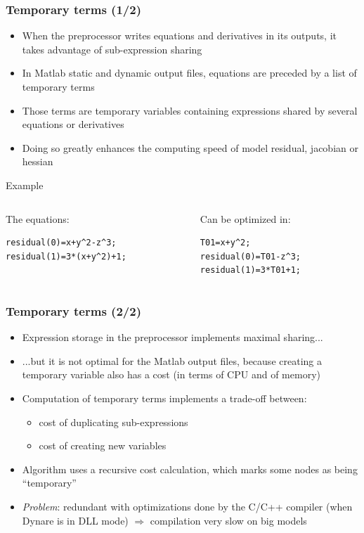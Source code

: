\documentclass{beamer}
\begin{document}
\begin{frame}[fragile]
  \frametitle{Temporary terms (1/2)}
  \begin{itemize}
  \item When the preprocessor writes equations and derivatives in its outputs, it takes advantage of sub-expression sharing
  \item In Matlab static and dynamic output files, equations are preceded by a list of \alert{temporary terms}
  \item Those terms are temporary variables containing expressions shared by several equations or derivatives
  \item Doing so greatly enhances the computing speed of model residual, jacobian or hessian
  \end{itemize}
  \begin{block}{Example}
    \begin{columns}[t]
      \begin{column}{6cm}
        The equations:
\begin{verbatim}
residual(0)=x+y^2-z^3;
residual(1)=3*(x+y^2)+1;
\end{verbatim}
      \end{column}
      \begin{column}{4.8cm}
        Can be optimized in:
\begin{verbatim}
T01=x+y^2;
residual(0)=T01-z^3;
residual(1)=3*T01+1;
\end{verbatim}
      \end{column}
    \end{columns}
  \end{block}
\end{frame}

\begin{frame}
  \frametitle{Temporary terms (2/2)}
  \begin{itemize}
  \item Expression storage in the preprocessor implements maximal sharing...
  \item ...but it is not optimal for the Matlab output files, because creating a temporary variable also has a cost (in terms of CPU and of memory)
  \item Computation of temporary terms implements a trade-off between:
    \begin{itemize}
    \item cost of duplicating sub-expressions
    \item cost of creating new variables
    \end{itemize}
  \item Algorithm uses a recursive cost calculation, which marks some nodes as being ``temporary''
  \item \textit{Problem}: redundant with optimizations done by the C/C++ compiler (when Dynare is in DLL mode) $\Rightarrow$ compilation very slow on big models
  \end{itemize}
\end{frame}
\end{document}
